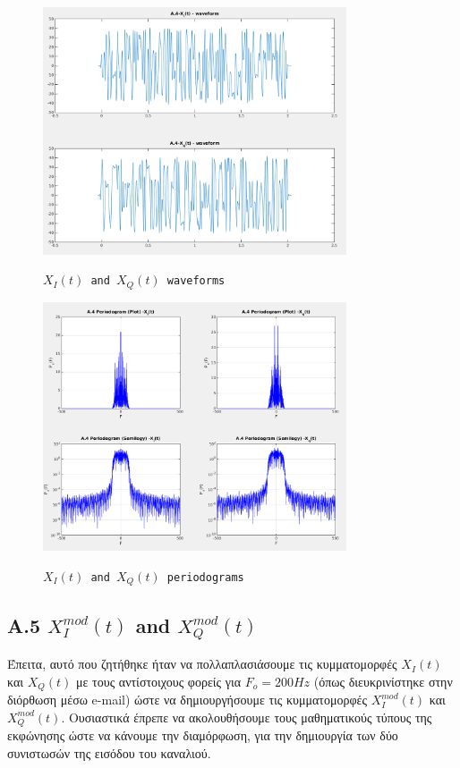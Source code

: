 \documentclass[11pt]{article}
\begin{document}
     \begin{figure}[H]
        \centering
        \includegraphics[scale=0.5, width=0.8\textwidth]{img/A4_wave.png} \\
        \caption{\texttt{$X_I(t)$ and $X_Q(t)$ waveforms}}
    \end{figure}
    
    \begin{figure}[H]
        \centering
        \includegraphics[scale=0.5, width=0.8\textwidth]{img/A4_Period.png} \\
        \caption{\texttt{$X_I(t)$ and $X_Q(t)$ periodograms}}
    \end{figure}
    
    \subsection*{A.5 $X_I^{mod}(t)$ and $X_Q^{mod}(t)$}
    Έπειτα, αυτό που ζητήθηκε ήταν να πολλαπλασιάσουμε τις κυμματομορφές $X_I(t)$ και $X_Q(t)$ με τους αντίστοιχους φορείς για $F_o=200Hz$ (όπως διευκρινίστηκε στην διόρθωση μέσω e-mail) ώστε να δημιουργήσουμε τις κυμματομορφές $X_I^{mod}(t)$ και $X_Q^{mod}(t)$. 
    Ουσιαστικά έπρεπε να ακολουθήσουμε τους μαθηματικούς τύπους της εκφώνησης ώστε να κάνουμε την διαμόρφωση, για την δημιουργία των δύο συνιστωσών της εισόδου του καναλιού.
    
\end{document}
